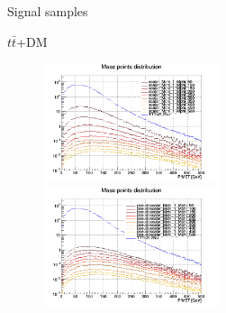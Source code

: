 \documentclass[8pt]{beamer}
\begin{document}
\begin{frame}{Signal samples}
\vspace{-5pt}
\begin{block}{\centering $t \bar t$+DM}\end{block} \vspace{-10pt}
\begin{figure}[htbp]
\centering
\begin{minipage}[b]{.49\textwidth}
\begin{center}
\includegraphics[width=5.2cm, height=3.5cm]{figs/scalarMETmChi1.png}
\end{center}
\end{minipage}\hfill
\begin{minipage}[b]{.49\textwidth}
\begin{center}
\includegraphics[width=5.2cm, height=3.5cm]{figs/pseudoscalarMETmChi1.png}
\end{center}
\end{minipage} \hfill
\end{figure} \vfill
\end{frame}
\end{document}
